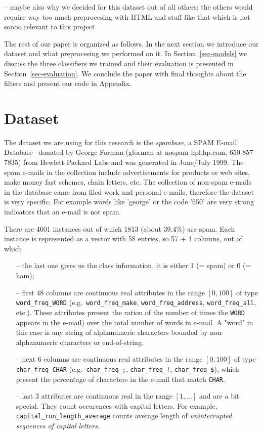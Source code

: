 \documentclass[11pt,a4paper]{article}
\begin{document}
-- maybe also why we decided for this dataset out of all others: the others would require way too much preprocesing with HTML and stuff like that which is not soooo relevant to this project

The rest of our paper is organized as follows. In the next section we introduce our dataset and what preprocesing we performed on it. In Section~\ref{sec-models} we discuss the three classifiers we trained and their evaluation is presented in Section~\ref{sec-evaluation}. We conclude the paper with final thoughts about the filters and present our code in Appendix.

\section{Dataset}
\label{sec-data}

The dataset we are using for this research is the {\em spambase}, a SPAM E-mail Database~\cite{spambase} donated by George Forman (gforman at nospam hpl.hp.com, 650-857-7835) from Hewlett-Packard Labs and was generated in June/July 1999. 
The spam e-mails in the collection include advertisements for products or web sites, make money fast schemes, chain letters, etc. The collection of non-spam e-mails in the database came from filed work and personal e-mails, therefore the dataset is very specific. For example words like 'george' or the code '650' are very strong indicators that an e-mail is not spam. 

There are 4601 instances out of which 1813 (about 39.4$\%$) are spam. Each instance is represented as a vector with 58 entries, so 57 + 1 columns, out of which
\begin{itemize}
  \item[--] the last one gives us the class information, it is either 1 (= spam) or 0 (= ham);
  \item[--] first 48 columns are continuous real attributes in the range $[0,100]$ of type {\tt word\_freq\_WORD} (e.g.\ {\tt word\_freq\_make}, {\tt word\_freq\_address}, {\tt word\_freq\_all}, etc.). 
  These attributes present the ration of the number of times the {\tt WORD} appears in the e-mail) over the total number of words in e-mail.  A "word" in this case is any 
string of alphanumeric characters bounded by non-alphanumeric characters or end-of-string.
  \item[--] next 6 columns are continuous real attributes in the range $[0,100]$ of type {\tt char\_freq\_CHAR} (e.g.\ {\tt char\_freq\_;}, {\tt char\_freq\_!}, {\tt char\_freq\_\$}), 
  which present the percentage of characters in the e-mail that match {\tt CHAR}.
  \item[--] last 3 attributes are continuous real in the range $[1,\ldots ]$ and are a bit special. They count occurences with capital letters. For example, {\tt capital\_run\_length\_average} counts average length of {\em uninterrupted sequences of capital letters}.
\end{itemize}
\end{document}
